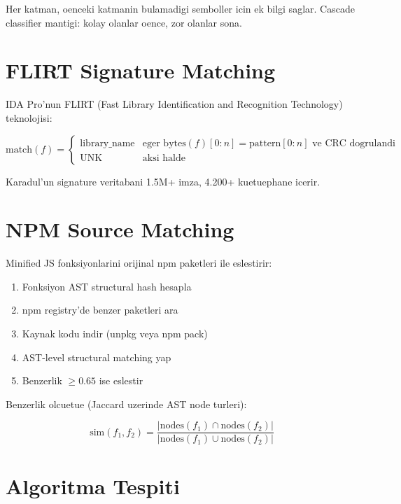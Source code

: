 \documentclass[12pt,a4paper,oneside]{book}
\theoremstyle{definition}
\begin{document}
Her katman, oenceki katmanin bulamadigi semboller icin ek bilgi saglar. Cascade classifier mantigi: kolay olanlar oence, zor olanlar sona.

\section{FLIRT Signature Matching}
\label{sec:flirt}

IDA Pro'nun FLIRT (Fast Library Identification and Recognition Technology) teknolojisi:

\begin{equation}
\text{match}(f) = \begin{cases}
\text{library\_name} & \text{eger } \text{bytes}(f)[0:n] = \text{pattern}[0:n] \text{ ve CRC dogrulandi} \\
\text{UNK} & \text{aksi halde}
\end{cases}
\end{equation}

Karadul'un signature veritabani 1.5M+ imza, 4.200+ kuetuephane icerir.

\section{NPM Source Matching}
\label{sec:npm-match}

Minified JS fonksiyonlarini orijinal npm paketleri ile eslestirir:

\begin{enumerate}
\item Fonksiyon AST structural hash hesapla
\item npm registry'de benzer paketleri ara
\item Kaynak kodu indir (unpkg veya npm pack)
\item AST-level structural matching yap
\item Benzerlik $\geq 0.65$ ise eslestir
\end{enumerate}

Benzerlik olcuetue (Jaccard uzerinde AST node turleri):

\begin{equation}
\text{sim}(f_1, f_2) = \frac{|\text{nodes}(f_1) \cap \text{nodes}(f_2)|}{|\text{nodes}(f_1) \cup \text{nodes}(f_2)|}
\end{equation}

\section{Algoritma Tespiti}
\label{sec:algo-id}
\end{document}
